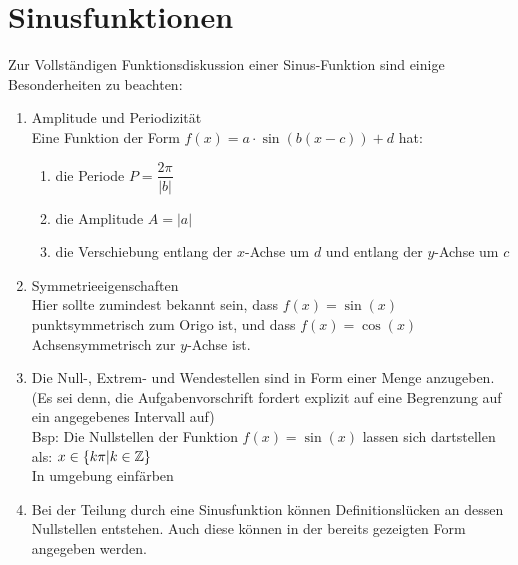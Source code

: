 \section{Sinusfunktionen}
Zur Vollständigen Funktionsdiskussion einer Sinus-Funktion sind einige Besonderheiten zu beachten:
\begin{enumerate}
\item Amplitude und Periodizität\\
Eine Funktion der Form $f(x)=a\cdot\sin(b(x-c))+d$ hat:\begin{enumerate}
\item die Periode $P = \dfrac{2\pi}{|b|}$
\item die Amplitude $A = |a|$
\item die Verschiebung entlang der $x$-Achse um $d$ und entlang der $y$-Achse um $c$
\end{enumerate}
\item Symmetrieeigenschaften\\
Hier sollte zumindest bekannt sein, dass $f(x)=\sin(x)$ punktsymmetrisch zum Origo ist, und dass $f(x)=\cos(x)$ Achsensymmetrisch zur $y$-Achse ist.
\item Die Null-, Extrem- und Wendestellen sind in Form einer Menge anzugeben. (Es sei denn, die Aufgabenvorschrift fordert explizit auf eine Begrenzung auf ein angegebenes Intervall auf)\\
Bsp: Die Nullstellen der Funktion $f(x)=\sin(x)$ lassen sich dartstellen als: $x \in \{k\pi|k \in \mathbb{Z}\}$
\\ In umgebung einfärben
\item Bei der Teilung durch eine Sinusfunktion können Definitionslücken an dessen Nullstellen entstehen. Auch diese können in der bereits gezeigten Form angegeben werden.
\end{enumerate}
